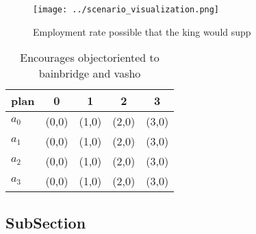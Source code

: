 \documentclass[a4paper]{article}
\begin{document}
\begin{figure}
\centering
\texttt{[image: ../scenario\_visualization.png]}
\caption{Employment rate possible that the king would supp
}
\end{figure}
 
\begin{table}
\begin{adjustbox}{width=0.5\columnwidth}
\begin{tabular}{|l|l|l|l|l|}
\hline
\textbf{plan} & \multicolumn{1}{c|}{\textbf{0}} & \multicolumn{1}{c|}{\textbf{1}} & \multicolumn{1}{c|}{\textbf{2}} & \multicolumn{1}{c|}{\textbf{3}} \\ \hline
\textbf{$a_0$}  & (0,0) & (1,0) & (2,0) & (3,0) \\ \hline
\textbf{$a_1$}  & (0,0) & (1,0) & (2,0) & (3,0) \\ \hline
\textbf{$a_2$}  & (0,0) & (1,0) & (2,0) & (3,0) \\ \hline
\textbf{$a_3$}  & (0,0) & (1,0) & (2,0) & (3,0) \\ \hline
\end{tabular}
\end{adjustbox}
\caption{Encourages objectoriented to bainbridge and vasho
}
\end{table}

\subsection{SubSection}
\end{document}
